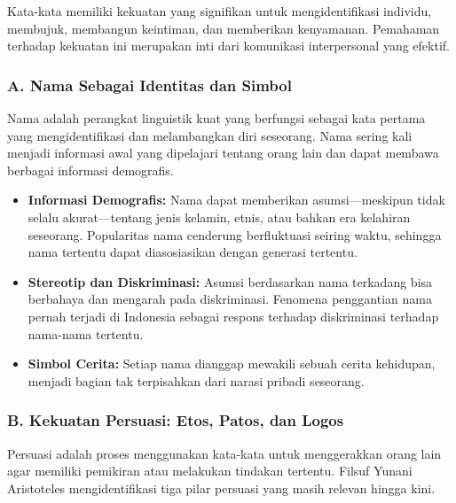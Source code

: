 \documentclass[
  letterpaper,
  DIV=11,
  numbers=noendperiod]{scrreprt}
\begin{document}
Kata-kata memiliki kekuatan yang signifikan untuk mengidentifikasi
individu, membujuk, membangun keintiman, dan memberikan kenyamanan.
Pemahaman terhadap kekuatan ini merupakan inti dari komunikasi
interpersonal yang efektif.

\subsubsection{A. Nama Sebagai Identitas dan
Simbol}\label{a.-nama-sebagai-identitas-dan-simbol}

Nama adalah perangkat linguistik kuat yang berfungsi sebagai kata
pertama yang mengidentifikasi dan melambangkan diri seseorang. Nama
sering kali menjadi informasi awal yang dipelajari tentang orang lain
dan dapat membawa berbagai informasi demografis.

\begin{itemize}
\item
  \textbf{Informasi Demografis:} Nama dapat memberikan asumsi---meskipun
  tidak selalu akurat---tentang jenis kelamin, etnis, atau bahkan era
  kelahiran seseorang. Popularitas nama cenderung berfluktuasi seiring
  waktu, sehingga nama tertentu dapat diasosiasikan dengan generasi
  tertentu.
\item
  \textbf{Stereotip dan Diskriminasi:} Asumsi berdasarkan nama terkadang
  bisa berbahaya dan mengarah pada diskriminasi. Fenomena penggantian
  nama pernah terjadi di Indonesia sebagai respons terhadap diskriminasi
  terhadap nama-nama tertentu.
\item
  \textbf{Simbol Cerita:} Setiap nama dianggap mewakili sebuah cerita
  kehidupan, menjadi bagian tak terpisahkan dari narasi pribadi
  seseorang.
\end{itemize}

\subsubsection{B. Kekuatan Persuasi: Etos, Patos, dan
Logos}\label{b.-kekuatan-persuasi-etos-patos-dan-logos}

Persuasi adalah proses menggunakan kata-kata untuk menggerakkan orang
lain agar memiliki pemikiran atau melakukan tindakan tertentu. Filsuf
Yunani Aristoteles mengidentifikasi tiga pilar persuasi yang masih
relevan hingga kini.
\end{document}
